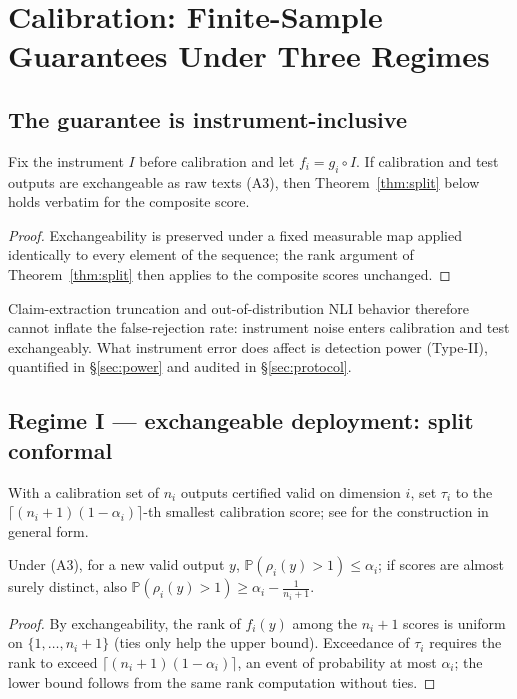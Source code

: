 \section{Calibration: Finite-Sample Guarantees Under Three Regimes}
\label{sec:calibration}

\subsection{The guarantee is instrument-inclusive}

\begin{proposition}
\label{prop:composite}
Fix the instrument $I$ before calibration and let $f_i=g_i\circ I$. If
calibration and test outputs are exchangeable as raw texts (A3), then
Theorem~\ref{thm:split} below holds verbatim for the composite score.
\end{proposition}
\begin{proof}
Exchangeability is preserved under a fixed measurable map applied identically
to every element of the sequence; the rank argument of
Theorem~\ref{thm:split} then applies to the composite scores unchanged.
\end{proof}

Claim-extraction truncation and out-of-distribution NLI behavior therefore
cannot inflate the false-rejection rate: instrument noise enters calibration
and test exchangeably. What instrument error does affect is detection power
(Type-II), quantified in \S\ref{sec:power} and audited in
\S\ref{sec:protocol}.

\subsection{Regime I --- exchangeable deployment: split conformal}

With a calibration set of $n_i$ outputs certified valid on dimension $i$, set
$\tau_i$ to the $\lceil(n_i+1)(1-\alpha_i)\rceil$-th smallest calibration
score; see \cite{angelopoulos2023} for the construction in general form.

\begin{theorem}
\label{thm:split}
Under (A3), for a new valid output $y$, $\mathbb P(\rho_i(y)>1)\le\alpha_i$;
if scores are almost surely distinct, also
$\mathbb P(\rho_i(y)>1)\ge\alpha_i-\frac1{n_i+1}$.
\end{theorem}
\begin{proof}
By exchangeability, the rank of $f_i(y)$ among the $n_i+1$ scores is uniform
on $\{1,\dots,n_i+1\}$ (ties only help the upper bound). Exceedance of
$\tau_i$ requires the rank to exceed $\lceil(n_i+1)(1-\alpha_i)\rceil$, an
event of probability at most $\alpha_i$; the lower bound follows from the same
rank computation without ties.
\end{proof}

